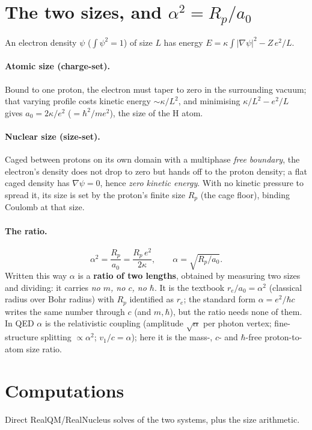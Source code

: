 \documentclass[11pt]{article}
\newcommand{\grad}{\nabla}
\begin{document}
\section{The two sizes, and $\alpha^2=R_p/a_0$}\label{sec:sizes}
An electron density $\psi$ ($\int\psi^2=1$) of size $L$ has energy $E=\kappa\!\int|\grad\psi|^2 - Z\,e^2/L$.

\paragraph{Atomic size (charge-set).} Bound to one proton, the electron must taper to zero in the surrounding
vacuum; that varying profile costs kinetic energy ${\sim}\kappa/L^2$, and minimising $\kappa/L^2-e^2/L$ gives
$a_0=2\kappa/e^2$ ($=\hbar^2/me^2$), the size of the H atom.

\paragraph{Nuclear size (size-set).} Caged between protons on its own domain with a multiphase \emph{free
boundary}, the electron's density does not drop to zero but hands off to the proton density; a flat caged
density has $\grad\psi=0$, hence \emph{zero kinetic energy}. With no kinetic pressure to spread it, its size
is set by the proton's finite size $R_p$ (the cage floor), binding Coulomb at that size.

\paragraph{The ratio.}
\begin{equation}
\boxed{\ \alpha^2=\frac{R_p}{a_0}=\frac{R_p\,e^2}{2\kappa},\qquad \alpha=\sqrt{R_p/a_0}.\ }
\end{equation}
Written this way $\alpha$ is a \textbf{ratio of two lengths}, obtained by measuring two sizes and dividing:
it carries \emph{no $m$, no $c$, no $\hbar$}. It is the textbook $r_e/a_0=\alpha^2$ (classical radius over
Bohr radius) with $R_p$ identified as $r_e$; the standard form $\alpha=e^2/\hbar c$ writes the same number
through $c$ (and $m,\hbar$), but the ratio needs none of them. In QED $\alpha$ is the relativistic coupling
(amplitude $\sqrt\alpha$ per photon vertex; fine-structure splitting $\propto\alpha^2$; $v_1/c=\alpha$);
here it is the mass-, $c$- and $\hbar$-free proton-to-atom size ratio.

\section{Computations}\label{sec:comp}
Direct RealQM/RealNucleus solves of the two systems, plus the size arithmetic.
\end{document}
